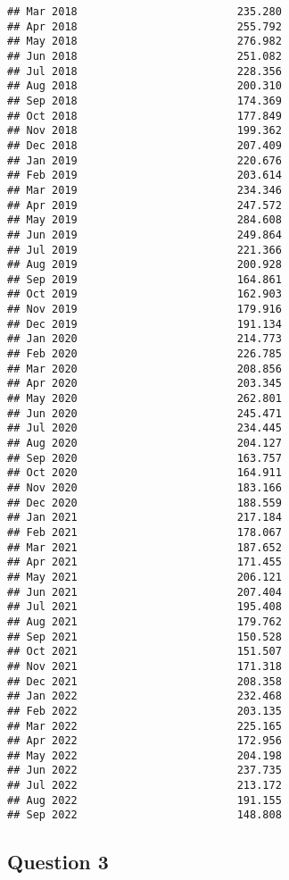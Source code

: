 \documentclass[
]{article}
\begin{document}
\begin{verbatim}
## Mar 2018                         235.280
## Apr 2018                         255.792
## May 2018                         276.982
## Jun 2018                         251.082
## Jul 2018                         228.356
## Aug 2018                         200.310
## Sep 2018                         174.369
## Oct 2018                         177.849
## Nov 2018                         199.362
## Dec 2018                         207.409
## Jan 2019                         220.676
## Feb 2019                         203.614
## Mar 2019                         234.346
## Apr 2019                         247.572
## May 2019                         284.608
## Jun 2019                         249.864
## Jul 2019                         221.366
## Aug 2019                         200.928
## Sep 2019                         164.861
## Oct 2019                         162.903
## Nov 2019                         179.916
## Dec 2019                         191.134
## Jan 2020                         214.773
## Feb 2020                         226.785
## Mar 2020                         208.856
## Apr 2020                         203.345
## May 2020                         262.801
## Jun 2020                         245.471
## Jul 2020                         234.445
## Aug 2020                         204.127
## Sep 2020                         163.757
## Oct 2020                         164.911
## Nov 2020                         183.166
## Dec 2020                         188.559
## Jan 2021                         217.184
## Feb 2021                         178.067
## Mar 2021                         187.652
## Apr 2021                         171.455
## May 2021                         206.121
## Jun 2021                         207.404
## Jul 2021                         195.408
## Aug 2021                         179.762
## Sep 2021                         150.528
## Oct 2021                         151.507
## Nov 2021                         171.318
## Dec 2021                         208.358
## Jan 2022                         232.468
## Feb 2022                         203.135
## Mar 2022                         225.165
## Apr 2022                         172.956
## May 2022                         204.198
## Jun 2022                         237.735
## Jul 2022                         213.172
## Aug 2022                         191.155
## Sep 2022                         148.808
\end{verbatim}

\hypertarget{question-3}{%
\subsection{Question 3}\label{question-3}}
\end{document}

